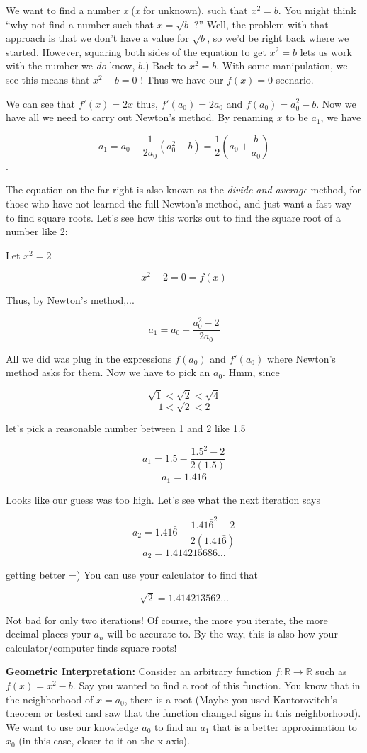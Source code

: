 \documentclass[12pt]{article}
\begin{document}
We want to find a number \emph{x} (\emph{x} for unknown), such that $x^2=b$. You might think ``why not find 
a number such that  $x=\sqrt{b}$ ?'' Well, the problem with that approach is that we don't have a value for $\sqrt{b}$, so we'd be right back where we started. However, squaring both sides of the equation to get $x^2 = b$ lets us work with the number we \emph{do} know, $b$.)  Back to $x^2=b$.  With some manipulation, we see this means that $x^2-b=0$ ! Thus we have our $f(x)=0$ scenario.

We can see that $f'(x)=2x$ thus, $f'(a_0)=2a_0$ and $f(a_0)=a_0^2-b$. Now we have all we need to carry out Newton's method. By renaming $x$ to be $a_1$, we have 

$$a_1 = a_0 - \frac{1}{2a_0}(a_0^2-b) = \frac{1}{2}\left(a_0+\frac{b}{a_0}\right)$$.

The equation on the far right is also known as the \emph{divide and average} method, for those who have not learned the full Newton's method, and just want a fast way to find square roots. Let's see how this works out to find the square root of a number like 2:

Let $x^2=2$

$$x^2-2=0=f(x)$$

Thus, by Newton's method,...

$$a_1 = a_0 - \frac{a_0^2-2}{2a_0}$$

All we did was plug in the expressions $f(a_0)$ and $f'(a_0)$ where Newton's method asks for them. Now we have to pick an $a_0$. Hmm, since

$$\sqrt{1}<\sqrt{2}<\sqrt{4}$$
$$1<\sqrt{2}<2$$ 

let's pick a reasonable number between 1 and 2 like 1.5

$$a_1 = 1.5 - \frac{1.5^2-2}{2(1.5)}$$
$$a_1 = 1.41\bar{6}$$ 

Looks like our guess was too high. Let's see what the next iteration says

$$a_2 = 1.41\bar{6} - \frac{1.41\bar{6}^2-2}{2(1.41\bar{6})}$$
$$a_2 = 1.414215686\dots$$ 

getting better =) You can use your calculator to find that

$$\sqrt{2} = 1.414213562\dots$$

Not bad for only two iterations! Of course, the more you iterate, the more decimal places your $a_n$ will be accurate to. By the way, this is also how your calculator/computer finds square roots!

\textbf{Geometric Interpretation:} Consider an arbitrary function $f\colon\mathbb{R}\rightarrow\mathbb{R}$ such as $f(x)=x^2-b$. Say you wanted to find a root of this function. You know that in the neighborhood of $x=a_0$, there is a root (Maybe you used Kantorovitch's theorem or tested and saw that the function changed signs in this neighborhood). We want to use our knowledge $a_0$ to find an $a_1$ that is a better approximation to $x_0$ (in this case, closer to it on the x-axis).
\end{document}
